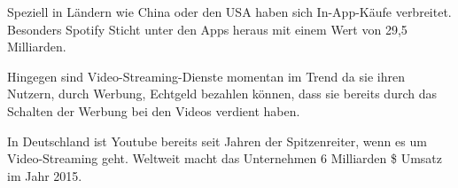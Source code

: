 Speziell in Ländern wie China oder den USA haben sich In-App-Käufe verbreitet. Besonders Spotify Sticht unter den Apps heraus mit einem Wert von 29,5 Milliarden. 
 
Hingegen sind Video-Streaming-Dienste momentan im Trend da sie ihren Nutzern, durch Werbung, Echtgeld bezahlen können, dass sie bereits durch das Schalten der Werbung bei den Videos verdient haben.
   
In Deutschland ist Youtube bereits seit Jahren der Spitzenreiter, wenn es um Video-Streaming geht. Weltweit macht das Unternehmen 6 Milliarden \$ Umsatz im Jahr 2015. %

